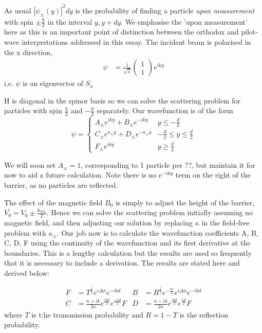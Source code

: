 \documentclass{article}
\begin{document}
As usual $|\psi_{\pm}(y)|^{2}dy$ is the probability of finding a particle \textit{upon measurement} with spin $\pm \frac{\hbar}{2}$ in the interval $y, y+dy$. We emphasise the 'upon measurement' here as this is an important point of distinction between the orthodox and pilot-wave interpretations addressed in this essay. The incident beam is polarised in the x direction,
\begin{align}
	\psi &= \frac{1}{\sqrt{2}}
	\begin{pmatrix}
	1\\
	1
	\end{pmatrix}
	e^{i k y}
\end{align}
i.e. $\psi$ is an eigenvector of $S_{x}$

H is diagonal in the spinor basis so we can solve the scattering problem for particles with spin $\frac{\hbar}{2}$ and $-\frac{\hbar}{2}$ separately. 
Our wavefunction is of the form
\begin{equation}
	\psi = 
	\begin{cases}
		A_{\pm}e^{i k y} + B_{\pm}e^{-i k y} & y \leq -\frac{d}{2} \\
		C_{\pm}e^{\kappa_{\pm}y} + D_{\pm}e^{-\kappa_{\pm}y} & -\frac{d}{2} \leq y \leq \frac{d}{2} \\
		F_{\pm}e^{i k y} & y \geq \frac{d}{2}
	\end{cases}
\end{equation}

We will soon set $A_{\pm} = 1$, corresponding to 1 particle per ??, but maintain it for now to aid a future calculation. Note there is no $e^{-i k y}$ term on the right of the barrier, as no particles are reflected. 

The effect of the magnetic field $B_0$ is simply to adjust the height of the barrier, $V_0^{'} = V_0 \pm \frac{\hbar \omega_L}{2}$. Hence we can solve the scattering problem initially assuming no magnetic field, and then adjusting our solution by replacing $\kappa$ in the field-free problem with $\kappa_{\pm}$. Our job now is to calculate the wavefunction coefficients A, B, C, D, F using the continuity of the wavefunction and its first derivative at the boundaries.
This is a lengthy calculation but the results are used so frequently that it is necessary to include a derivation. The results are stated here and derived below:

\begin{align}
	F &= T^{\frac{1}{2}}e^{i\Delta\phi}e^{-ikd} & B &= R^{\frac{1}{2}}e^{-\frac{i\pi}{2}}e^{i\Delta\phi}e^{-ikd} \nonumber \\
	C &= \frac{\kappa+ik}{2\kappa}e^{\frac{ikd}{2}}e^{\frac{-\kappa d}{2}}F & D &= \frac{\kappa-ik}{2\kappa}e^{\frac{ikd}{2}}e^{\frac{\kappa d}{2}}F \label{cont0}
\end{align}
where $T$ is t:he transmission probability and $R = 1-T$ is the reflection probability.
\end{document}
